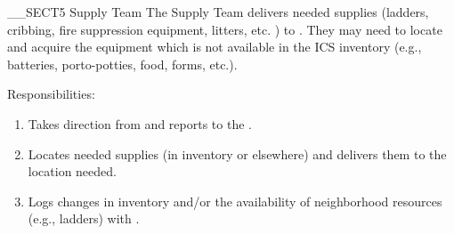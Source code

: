 __SECT5{ Supply Team 
\label{sec:SupplyTeam} }
The Supply Team delivers needed supplies 
(ladders, cribbing, fire suppression equipment, litters, etc. )
to \ResponseTeams.
They may need to locate and acquire the equipment which is not 
available in the ICS inventory 
(e.g., batteries, porto-potties, food, forms, etc.).

Responsibilities:
\begin{enumerate}
\item Takes direction from and reports to the \EquipmentManager.
\item Locates needed supplies (in inventory or elsewhere) and delivers them to the location needed.
\item Logs changes in inventory and/or the availability of neighborhood resources (e.g., ladders) with \InventoryManager.
\end{enumerate}

